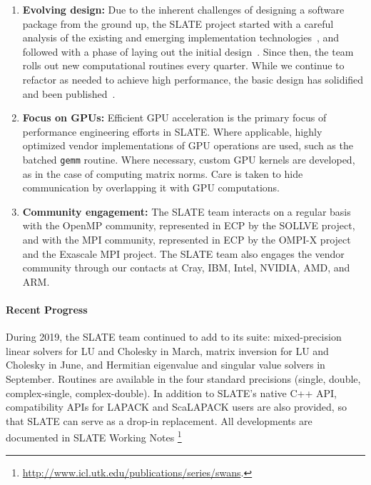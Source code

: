 \begin{enumerate}

\item
\textbf{Evolving design:}
Due to the inherent challenges of designing a software package
from the ground up, the SLATE project started
with a careful analysis of the existing and emerging
implementation technologies~\cite{abdelfattah2017roadmap},
and followed with a phase
of laying out the initial design~\cite{kurzak2017designing}.
Since then, the team rolls out new computational routines every quarter.
While we continue to refactor as needed to achieve high performance, the basic
design has solidified and been published~\cite{gates2019slate-design}.

\item
\textbf{Focus on GPUs:}
Efficient GPU acceleration is the primary focus of performance
engineering efforts in SLATE.
Where applicable, highly optimized vendor implementations of GPU operations
are used, such as the batched \texttt{gemm} routine.
Where necessary, custom GPU kernels are developed, as in the case of computing
matrix norms.
Care is taken to hide communication by overlapping it with GPU computations.

\item
\textbf{Community engagement:}
The SLATE team interacts on a regular basis with the OpenMP community,
represented in ECP by the SOLLVE project, and with the MPI community,
represented in ECP by the OMPI-X project and the Exascale MPI project.
The SLATE team also engages the vendor community through our contacts
at Cray, IBM, Intel, NVIDIA, AMD, and ARM.

\end{enumerate}

\paragraph{Recent Progress}

During 2019, the SLATE team continued to add to its suite:
mixed-precision linear solvers for LU and Cholesky in March,
matrix inversion for LU and Cholesky in June,
and Hermitian eigenvalue and singular value solvers in September.
Routines are available in the four standard precisions (single, double,
complex-single, complex-double).
In addition to SLATE's native C++ API, compatibility APIs for LAPACK
and ScaLAPACK users are also provided, so that SLATE can serve
as a drop-in replacement.
All developments are documented in SLATE Working Notes
\footnote{\url{http://www.icl.utk.edu/publications/series/swans}.}


